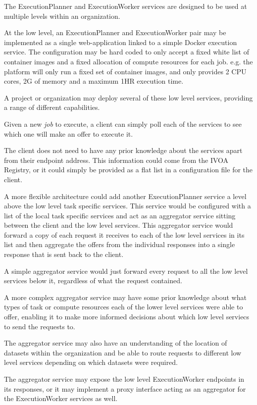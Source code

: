 \documentclass[11pt,a4paper]{ivoa}
\newcommand{\ivoa} {IVOA}
\newcommand{\execplanner} {ExecutionPlanner}
\newcommand{\execworker} {ExecutionWorker}
\newcommand{\docker} {Docker}
\newcommand{\dataset} {dataset}
\newcommand{\cpu} {CPU}
\newcommand{\job} {\textit{job}}
\begin{document}
The \execplanner{} and \execworker{} services are designed to be used at multiple levels within an organization.

At the low level, an \execplanner{} and \execworker{} pair may be implemented as a
single web-application linked to a simple \docker{} execution service.
The configuration may be hard coded to only accept a fixed white list of container images
and a fixed allocation of compute resources for each job{}.
e.g. the platform will only run a fixed set of container images, and only provides 2 \cpu{} cores, 2G of memory and a maximum 1HR execution time.

A project or organization may deploy several of these low level services,
providing a range of different capabilities.

Given a new \job{} to execute, a client can simply poll each of the services to see which one will
make an offer to execute it.

The client does not need to have any prior knowledge about the services apart from their
endpoint address.
This information could come from the \ivoa{} Registry, or it could simply
be provided as a flat list in a configuration file for the client.

A more flexible architecture could add another \execplanner{} service
a level above the low level task specific services.
This service would be configured with a list of the local task specific services
and act as an aggregator service sitting between the client and the low level services.
This aggregator service would forward a copy of each request it receives to each of the low level services in its list and
then aggregate the offers from the individual responses into a single response that is sent back to the client.

A simple aggregator service would just forward every request to all the low level services below it,
regardless of what the request contained.

A more complex aggregator service may have some prior knowledge about what types of task or compute resources
each of the lower level services were able to offer, enabling it to make more informed decisions about
which low level serviecs to send the requests to.

The aggregator service may also have an understanding of the location of \dataset{}s within the organization and
be able to route requests to different low level services depending on which \dataset{}s were required.

The aggregator service may expose the low level \execworker{} endpoints in its responses,
or it may implement a proxy interface acting as an aggregator for the \execworker{}
services as well.
\end{document}
